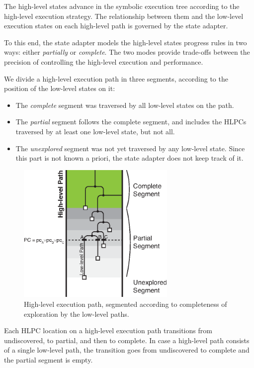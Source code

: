 The high-level states advance in the symbolic execution tree according to the high-level execution strategy.
%
The relationship between them and the low-level execution states on each high-level path is governed by the state adapter.

To this end, the state adapter models the high-level states progress rules in two ways: either \emph{partially} or \emph{complete}.
%
The two modes provide trade-offs between the precision of controlling the high-level execution and performance.

We divide a high-level execution path in three segments, according to the position of the low-level states on it:
\begin{itemize}
\item The \emph{complete} segment was traversed by all low-level states on the path.
\item The \emph{partial} segment follows the complete segment, and includes the HLPCs traversed by at least one low-level state, but not all.
\item The \emph{unexplored} segment was not yet traversed by any low-level state.  Since this part is not known a priori, the state adapter does not keep track of it.
\end{itemize}

\begin{figure}
  \centering
  \includegraphics[width=3in]{figures/chef/path-segments}
  \caption{High-level execution path, segmented according to completeness of exploration by the low-level paths.}
  \label{fig:chef:path-segments}
\end{figure}


Each HLPC location on a high-level execution path transitions from undiscovered, to partial, and then to complete.
%
In case a high-level path consists of a single low-level path, the transition goes from undiscovered to complete and the partial segment is empty.

